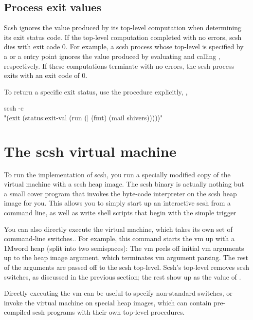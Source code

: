 \subsection{Process exit values}
Scsh ignores the value produced by its top-level computation when determining
its exit status code. 
If the top-level computation completed with no errors, 
scsh dies with exit code 0.
For example, a scsh process whose top-level is specified by a 
or a  entry point ignores the value produced
by evaluating  and calling , respectively.
If these computations terminate with no errors, the scsh process
exits with an exit code of 0.

To return a specific exit status, use the  procedure explicitly, \eg,
\begin{tightcode}
scsh -c \\
  "(exit (status:exit-val (run (| (fmt) (mail shivers)))))"\end{tightcode}

\section{The scsh virtual machine}
To run the {\scm} implementation of scsh, you run a specially modified
copy of the {\scm} virtual machine with a scsh heap image.
The scsh binary is actually nothing but a small cover program that invokes the
byte-code interpreter on the scsh heap image for you.
This allows you to simply start up an interactive scsh from a command
line, as well as write shell scripts that begin with the simple trigger

You can also directly execute the virtual machine, 
which takes its own set of command-line switches..
For example,
this command starts the vm up with a 1Mword heap (split into two semispaces):
The vm peels off initial vm arguments
up to the  heap image argument, which terminates vm argument parsing.
The rest of the arguments are passed off to the scsh top-level.
Scsh's top-level removes scsh switches, as discussed in the previous section;
the rest show up as the value of .

Directly executing the vm can be useful to specify non-standard switches, or
invoke the virtual machine on special heap images, which can contain
pre-compiled scsh programs with their own top-level procedures.

